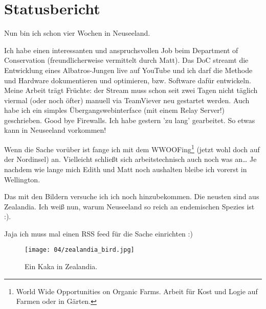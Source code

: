 \chapter{Statusbericht}

Nun bin ich schon vier Wochen in Neuseeland.

Ich habe einen interessanten und anspruchsvollen Job beim Department of
Conservation (freundlicherweise vermittelt durch Matt). Das DoC streamt
die Entwicklung eines Albatros-Jungen live auf YouTube und ich darf die
Methode und Hardware dokumentieren und optimieren, bzw. Software dafür
entwickeln. Meine Arbeit trägt Früchte: der Stream muss schon seit zwei
Tagen nicht täglich viermal (oder noch öfter) manuell via TeamViever neu
gestartet werden. Auch habe ich ein simples Übergangswebinterface (mit
einem Relay Server!) geschrieben. Good bye Firewalls. Ich habe gestern
'zu lang' gearbeitet. So etwas kann in Neuseeland vorkommen!


Wenn die Sache vorüber ist fange ich mit dem WWOOFing\footnote{World
Wide Opportunities on Organic Farms. Arbeit f\"ur Kost und Logie auf
Farmen oder in G\"arten.} (jetzt wohl doch auf der Nordinsel)
an. Vielleicht schließt sich arbeitstechnisch auch noch was an\ldots{}
Je nachdem wie lange mich Edith und Matt noch aushalten bleibe ich
vorerst in Wellington.

Das mit den Bildern versuche ich ich noch hinzubekommen. Die neusten
sind aus Zealandia. Ich weiß nun, warum Neuseeland so reich an
endemischen Spezies ist :).

Jaja ich muss mal einen RSS feed für die Sache einrichten :)

\begin{figure}[h]
  \centering
  \texttt{[image: 04/zealandia\_bird.jpg]}
  \caption*{Ein Kaka in Zealandia.}
\end{figure}
